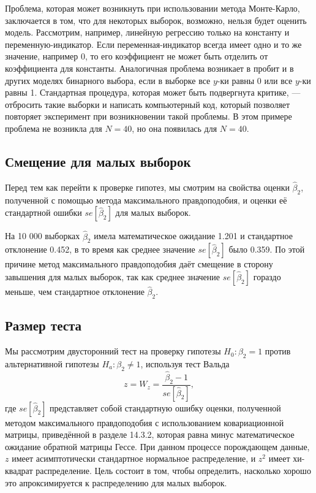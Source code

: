 Проблема, которая может возникнуть при использовании метода Монте-Карло, заключается в том, что для некоторых выборок, возможно, нельзя будет оценить модель. Рассмотрим, например, линейную регрессию только на константу и переменную-индикатор. Если переменная-индикатор всегда имеет одно и то же значение, например 0,  то его коэффициент не может быть отделить от коэффициента для константы. Аналогичная проблема возникает в пробит и в других моделях бинарного выбора, если в выборке все $y$-ки равны 0 или все $y$-ки равны 1. Стандартная процедура, которая может быть подвергнута критике, --- отбросить такие выборки и написать компьютерный код, который позволяет повторяет эксперимент при возникновении такой проблемы. В этом примере проблема не возникла для $N = 40$, но она появилась для $N = 40$.

\subsection{Смещение для малых выборок}

Перед тем как перейти к проверке гипотез, мы смотрим на свойства оценки $\hat{\beta}_2$, полученной с помощью метода максимального правдоподобия, и оценки её стандартной ошибки $se[\hat{\beta}_2]$ для малых выборок.

На 10 000 выборках $\hat{\beta}_2$ имела математическое ожидание 1.201 и стандартное отклонение 0.452,
в то время как среднее значение $se[\hat{\beta}_2]$ было 0.359. По этой причине метод максимального правдоподобия даёт смещение в сторону завышения для малых выборок, так как среднее значение $se[\hat{\beta}_2]$ гораздо меньше, чем стандартное отклонение $\hat{\beta}_2$.

\subsection{Размер теста}

Мы рассмотрим двусторонний тест на проверку гипотезы $H_0: \beta_2 = 1$ против альтернативной гипотезы $H_a: \beta_2 \not= 1$, используя тест Вальда
\[
z = W_z = \frac{\hat{\beta}_2 - 1}{se[\hat{\beta}_2]}, 
\]
где $se[\hat{\beta}_2]$ представляет собой стандартную ошибку оценки, полученной методом максимального правдоподобия с использованием ковариационной матрицы, приведённой в разделе 14.3.2, которая равна минус математическое ожидание обратной матрицы Гессе. При данном процессе порождающем данные, $z$ имеет асимптотически стандартное нормальное распределение, и $z^2$ имеет хи-квадрат распределение. Цель состоит в том, чтобы определить, насколько хорошо это апроксимируется к распределению для малых выборок.

